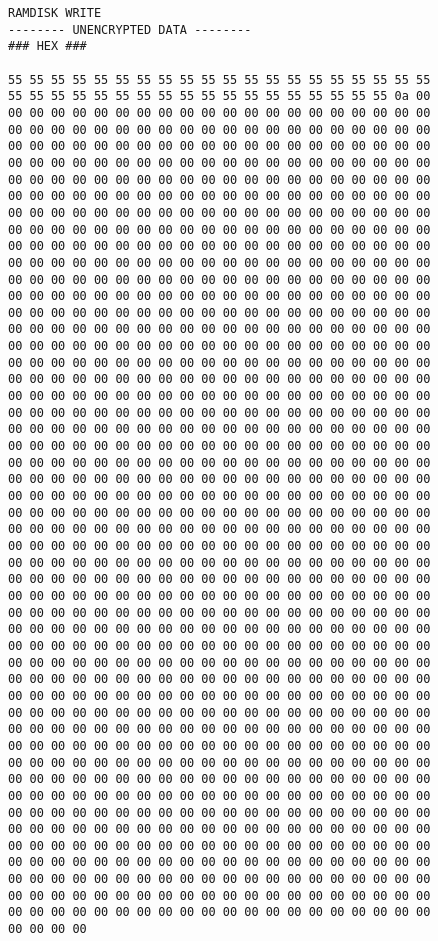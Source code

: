 \documentclass[11pt,letterpaper]{article}
\begin{document}
{\small
\begin{verbatim}
RAMDISK WRITE
-------- UNENCRYPTED DATA --------
### HEX ###

55 55 55 55 55 55 55 55 55 55 55 55 55 55 55 55 55 55 55 55 
55 55 55 55 55 55 55 55 55 55 55 55 55 55 55 55 55 55 0a 00 
00 00 00 00 00 00 00 00 00 00 00 00 00 00 00 00 00 00 00 00 
00 00 00 00 00 00 00 00 00 00 00 00 00 00 00 00 00 00 00 00 
00 00 00 00 00 00 00 00 00 00 00 00 00 00 00 00 00 00 00 00 
00 00 00 00 00 00 00 00 00 00 00 00 00 00 00 00 00 00 00 00 
00 00 00 00 00 00 00 00 00 00 00 00 00 00 00 00 00 00 00 00 
00 00 00 00 00 00 00 00 00 00 00 00 00 00 00 00 00 00 00 00 
00 00 00 00 00 00 00 00 00 00 00 00 00 00 00 00 00 00 00 00 
00 00 00 00 00 00 00 00 00 00 00 00 00 00 00 00 00 00 00 00 
00 00 00 00 00 00 00 00 00 00 00 00 00 00 00 00 00 00 00 00 
00 00 00 00 00 00 00 00 00 00 00 00 00 00 00 00 00 00 00 00 
00 00 00 00 00 00 00 00 00 00 00 00 00 00 00 00 00 00 00 00 
00 00 00 00 00 00 00 00 00 00 00 00 00 00 00 00 00 00 00 00 
00 00 00 00 00 00 00 00 00 00 00 00 00 00 00 00 00 00 00 00 
00 00 00 00 00 00 00 00 00 00 00 00 00 00 00 00 00 00 00 00 
00 00 00 00 00 00 00 00 00 00 00 00 00 00 00 00 00 00 00 00 
00 00 00 00 00 00 00 00 00 00 00 00 00 00 00 00 00 00 00 00 
00 00 00 00 00 00 00 00 00 00 00 00 00 00 00 00 00 00 00 00 
00 00 00 00 00 00 00 00 00 00 00 00 00 00 00 00 00 00 00 00 
00 00 00 00 00 00 00 00 00 00 00 00 00 00 00 00 00 00 00 00 
00 00 00 00 00 00 00 00 00 00 00 00 00 00 00 00 00 00 00 00 
00 00 00 00 00 00 00 00 00 00 00 00 00 00 00 00 00 00 00 00 
00 00 00 00 00 00 00 00 00 00 00 00 00 00 00 00 00 00 00 00 
00 00 00 00 00 00 00 00 00 00 00 00 00 00 00 00 00 00 00 00 
00 00 00 00 00 00 00 00 00 00 00 00 00 00 00 00 00 00 00 00 
00 00 00 00 00 00 00 00 00 00 00 00 00 00 00 00 00 00 00 00 
00 00 00 00 00 00 00 00 00 00 00 00 00 00 00 00 00 00 00 00 
00 00 00 00 00 00 00 00 00 00 00 00 00 00 00 00 00 00 00 00 
00 00 00 00 00 00 00 00 00 00 00 00 00 00 00 00 00 00 00 00 
00 00 00 00 00 00 00 00 00 00 00 00 00 00 00 00 00 00 00 00 
00 00 00 00 00 00 00 00 00 00 00 00 00 00 00 00 00 00 00 00 
00 00 00 00 00 00 00 00 00 00 00 00 00 00 00 00 00 00 00 00 
00 00 00 00 00 00 00 00 00 00 00 00 00 00 00 00 00 00 00 00 
00 00 00 00 00 00 00 00 00 00 00 00 00 00 00 00 00 00 00 00 
00 00 00 00 00 00 00 00 00 00 00 00 00 00 00 00 00 00 00 00 
00 00 00 00 00 00 00 00 00 00 00 00 00 00 00 00 00 00 00 00 
00 00 00 00 00 00 00 00 00 00 00 00 00 00 00 00 00 00 00 00 
00 00 00 00 00 00 00 00 00 00 00 00 00 00 00 00 00 00 00 00 
00 00 00 00 00 00 00 00 00 00 00 00 00 00 00 00 00 00 00 00 
00 00 00 00 00 00 00 00 00 00 00 00 00 00 00 00 00 00 00 00 
00 00 00 00 00 00 00 00 00 00 00 00 00 00 00 00 00 00 00 00 
00 00 00 00 00 00 00 00 00 00 00 00 00 00 00 00 00 00 00 00 
00 00 00 00 00 00 00 00 00 00 00 00 00 00 00 00 00 00 00 00 
00 00 00 00 00 00 00 00 00 00 00 00 00 00 00 00 00 00 00 00 
00 00 00 00 00 00 00 00 00 00 00 00 00 00 00 00 00 00 00 00 
00 00 00 00 00 00 00 00 00 00 00 00 00 00 00 00 00 00 00 00 
00 00 00 00 00 00 00 00 00 00 00 00 00 00 00 00 00 00 00 00 
00 00 00 00 00 00 00 00 00 00 00 00 00 00 00 00 00 00 00 00 
00 00 00 00 00 00 00 00 00 00 00 00 00 00 00 00 00 00 00 00 
00 00 00 00 00 00 00 00 00 00 00 00 00 00 00 00 00 00 00 00 
00 00 00 00 


\end{verbatim}}
\end{document}
